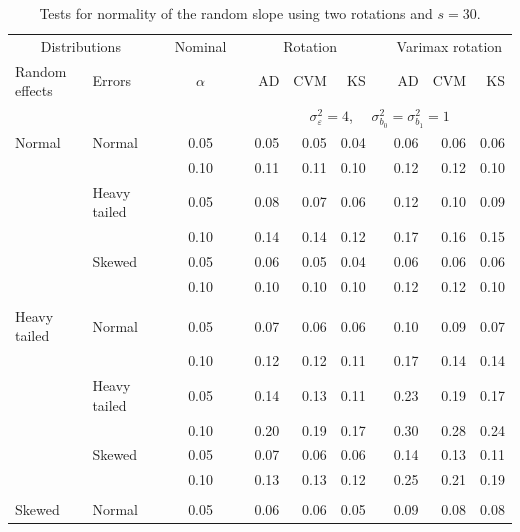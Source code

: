 \documentclass[12pt]{article} %
\begin{document}
\begin{table}[ht]
\caption{Tests for normality of the random slope using two rotations and $s = 30$.}
\begin{scriptsize}
\begin{center}
\begin{tabular}{ll p{.1cm} c p{.1cm} rrr p{.1cm} rrr}
  \hline
  \multicolumn{2}{c}{Distributions}& & Nominal & &  \multicolumn{3}{c}{Rotation} & & \multicolumn{3}{c}{Varimax rotation} \\ \cline{1-2} \cline{6-8} \cline{10-12}   
  Random effects & Errors & & $\alpha$ & & AD & CVM & KS & & AD & CVM & KS \\ 
   \hline
& && && \multicolumn{7}{c}{$\sigma_{\varepsilon}^2 = 4$, \ \ $\sigma_{b_0}^2 = \sigma_{b_1}^2 = 1$} \\ \cline{6-12}
\rowcolor{gray!20}Normal       & Normal       && 0.05 &&  0.05 & 0.05 & 0.04 && 0.06 & 0.06 & 0.06 \\ 
\rowcolor{gray!20}             &              && 0.10 &&  0.11 & 0.11 & 0.10 && 0.12 & 0.12 & 0.10 \\ 
\rowcolor{gray!20}             & Heavy tailed && 0.05 &&  0.08 & 0.07 & 0.06 && 0.12 & 0.10 & 0.09 \\ 
\rowcolor{gray!20}             &              && 0.10 &&  0.14 & 0.14 & 0.12 && 0.17 & 0.16 & 0.15 \\ 
\rowcolor{gray!20}             & Skewed       && 0.05 &&  0.06 & 0.05 & 0.04 && 0.06 & 0.06 & 0.06 \\ 
\rowcolor{gray!20}             &              && 0.10 &&  0.10 & 0.10 & 0.10 && 0.12 & 0.12 & 0.10 \\ 
             &&&&&&&&&&&\\
Heavy tailed & Normal       && 0.05 &&  0.07 & 0.06 & 0.06 && 0.10 & 0.09 & 0.07 \\ 
             &              && 0.10 &&  0.12 & 0.12 & 0.11 && 0.17 & 0.14 & 0.14 \\ 
             & Heavy tailed && 0.05 &&  0.14 & 0.13 & 0.11 && 0.23 & 0.19 & 0.17 \\ 
             &              && 0.10 &&  0.20 & 0.19 & 0.17 && 0.30 & 0.28 & 0.24 \\ 
             & Skewed       && 0.05 &&  0.07 & 0.06 & 0.06 && 0.14 & 0.13 & 0.11 \\ 
             &              && 0.10 &&  0.13 & 0.13 & 0.12 && 0.25 & 0.21 & 0.19 \\ 
             &&&&&&&&&&&\\
Skewed       & Normal       && 0.05 &&  0.06 & 0.06 & 0.05 && 0.09 & 0.08 & 0.08 \\ 

\end{tabular}
\end{center}
\end{scriptsize}
\end{table}
\end{document}
